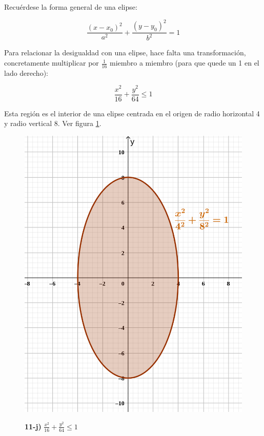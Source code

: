 \documentclass{article}
\begin{document}
Recuérdese la forma general de una elipse:

\begin{equation}
\frac{(x-x_0)^2}{a^2} + \frac{(y-y_0)^2}{b^2} = 1
\end{equation}

Para relacionar la desigualdad con una elipse, hace falta una transformación, concretamente multiplicar por $\frac{1}{16}$ miembro a miembro (para que quede un 1 en el lado derecho):

\begin{equation}
\frac{x^2}{16} + \frac{y^2}{64} \leq 1
\end{equation}

Esta región es el interior de una elipse centrada en el origen de radio horizontal 4 y radio vertical 8. Ver figura \ref{fig:1-11-j}.

\begin{figure}[ht]
\caption{\textbf{11-j)} $\frac{x^2}{16} + \frac{y^2}{64} \leq 1$}
\includegraphics[scale=0.3]{../img/exercises/guide_01/11_j.png} 
\centering
\label{fig:1-11-j}
\end{figure}
\end{document}
